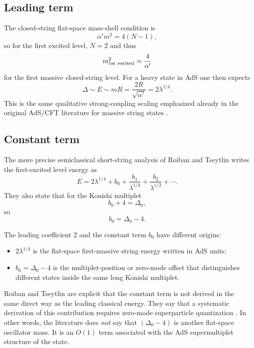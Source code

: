 \documentclass[12pt]{article}
\newcommand{\D}{\Delta}
\begin{document}
\subsection*{Leading term}

The closed-string flat-space mass-shell condition is
\begin{equation}
\alpha' m^2 = 4(N-1),
\end{equation}
so for the first excited level, $N=2$ and thus
\begin{equation}
m^2_{\rm 1st\ excited}=\frac{4}{\alpha'}
\end{equation}
for the first massive closed-string level.  For a heavy state in AdS one then expects
\begin{equation}
\D \sim E \sim mR = \frac{2R}{\sqrt{\alpha'}} = 2\lambda^{1/4}.
\end{equation}
This is the same qualitative strong-coupling scaling emphasized already in the original AdS/CFT
literature for massive string states \cite{GKP,AharonyReview}.

\subsection*{Constant term}

The more precise semiclassical short-string analysis of Roiban and Tseytlin writes the first-excited
level energy as \cite{RT2011}
\begin{equation}
E = 2\lambda^{1/4}+b_0+\frac{b_1}{\lambda^{1/4}}+\frac{b_2}{\lambda^{1/2}}+\cdots .
\end{equation}
They also state that for the Konishi multiplet
\begin{equation}
b_0+4=\D_0,
\end{equation}
so
\begin{equation}
b_0=\D_0-4.
\end{equation}

The leading coefficient $2$ and the constant term $b_0$ have different origins:
\begin{itemize}
\item $2\lambda^{1/4}$ is the flat-space first-massive string energy written in AdS units;
\item $b_0=\D_0-4$ is the multiplet-position or zero-mode offset that distinguishes different states
inside the same long Konishi multiplet.
\end{itemize}

Roiban and Tseytlin are explicit that the constant term is not derived in the same direct way as the
leading classical energy.  They say that a systematic derivation of this contribution requires
zero-mode superparticle quantization \cite{RT2011}.  In other words, the literature does \emph{not}
say that $(\D_0-4)$ is another flat-space oscillator mass.  It is an $O(1)$ term associated with the
AdS supermultiplet structure of the state.
\end{document}
